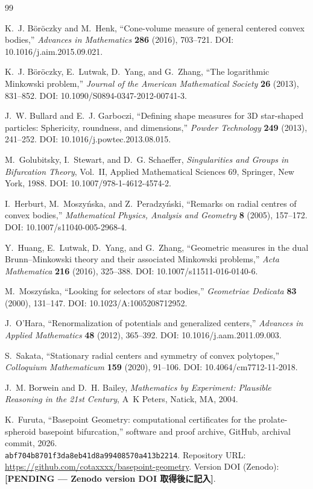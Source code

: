 \documentclass[a4paper,11pt]{ltjsarticle}
\theoremstyle{plain}
\theoremstyle{definition}
\begin{document}
\begin{thebibliography}{99}

K.~J. Böröczky and M.~Henk,
``Cone-volume measure of general centered convex bodies,''
\textit{Advances in Mathematics} \textbf{286} (2016), 703–721.
DOI: 10.1016/j.aim.2015.09.021.

K.~J. Böröczky, E.~Lutwak, D.~Yang, and G.~Zhang,
``The logarithmic Minkowski problem,''
\textit{Journal of the American Mathematical Society} \textbf{26} (2013), 831–852.
DOI: 10.1090/S0894-0347-2012-00741-3.

J.~W. Bullard and E.~J. Garboczi,
``Defining shape measures for 3D star-shaped particles: Sphericity, roundness, and dimensions,''
\textit{Powder Technology} \textbf{249} (2013), 241–252.
DOI: 10.1016/j.powtec.2013.08.015.

M.~Golubitsky, I.~Stewart, and D.~G. Schaeffer,
\textit{Singularities and Groups in Bifurcation Theory}, Vol.~II,
Applied Mathematical Sciences 69, Springer, New York, 1988.
DOI: 10.1007/978-1-4612-4574-2.

I.~Herburt, M.~Moszyńska, and Z.~Peradzyński,
``Remarks on radial centres of convex bodies,''
\textit{Mathematical Physics, Analysis and Geometry} \textbf{8} (2005), 157–172.
DOI: 10.1007/s11040-005-2968-4.

Y.~Huang, E.~Lutwak, D.~Yang, and G.~Zhang,
``Geometric measures in the dual Brunn–Minkowski theory and their associated Minkowski problems,''
\textit{Acta Mathematica} \textbf{216} (2016), 325–388.
DOI: 10.1007/s11511-016-0140-6.

M.~Moszyńska,
``Looking for selectors of star bodies,''
\textit{Geometriae Dedicata} \textbf{83} (2000), 131–147.
DOI: 10.1023/A:1005208712952.

J.~O'Hara,
``Renormalization of potentials and generalized centers,''
\textit{Advances in Applied Mathematics} \textbf{48} (2012), 365–392.
DOI: 10.1016/j.aam.2011.09.003.

S.~Sakata,
``Stationary radial centers and symmetry of convex polytopes,''
\textit{Colloquium Mathematicum} \textbf{159} (2020), 91–106.
DOI: 10.4064/cm7712-11-2018.

J.~M. Borwein and D.~H. Bailey,
\textit{Mathematics by Experiment: Plausible Reasoning in the 21st Century},
A~K Peters, Natick, MA, 2004.

K.~Furuta,
``Basepoint Geometry: computational certificates for the prolate-spheroid basepoint bifurcation,''
software and proof archive, GitHub,
archival commit, 2026.\\
\texttt{abf704b8701f3da8eb41d8a99408570a413b2214}.
Repository URL: \url{https://github.com/cotaxxxx/basepoint-geometry}.
Version DOI (Zenodo): \textbf{[PENDING — Zenodo version DOI 取得後に記入]}.

\end{thebibliography}
\end{document}
